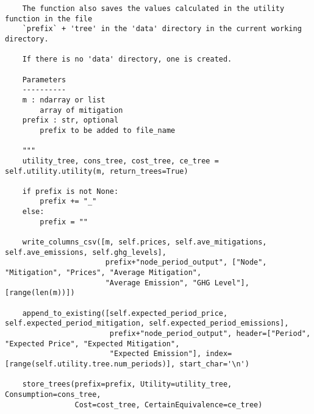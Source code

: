 \documentclass[12pt]{article}
\begin{document}
\begin{verbatim}
	The function also saves the values calculated in the utility function in the file
	`prefix` + 'tree' in the 'data' directory in the current working directory.

	If there is no 'data' directory, one is created.

	Parameters
	----------
	m : ndarray or list
		array of mitigation
	prefix : str, optional
		prefix to be added to file_name

	"""
	utility_tree, cons_tree, cost_tree, ce_tree = self.utility.utility(m, return_trees=True)
	
	if prefix is not None:
		prefix += "_"
	else:
		prefix = ""

	write_columns_csv([m, self.prices, self.ave_mitigations, self.ave_emissions, self.ghg_levels],
	                   prefix+"node_period_output", ["Node", "Mitigation", "Prices", "Average Mitigation",
	                   "Average Emission", "GHG Level"], [range(len(m))])

	append_to_existing([self.expected_period_price, self.expected_period_mitigation, self.expected_period_emissions],
						prefix+"node_period_output", header=["Period", "Expected Price", "Expected Mitigation",
						"Expected Emission"], index=[range(self.utility.tree.num_periods)], start_char='\n')

	store_trees(prefix=prefix, Utility=utility_tree, Consumption=cons_tree,
		        Cost=cost_tree, CertainEquivalence=ce_tree)
\end{verbatim}
\end{document}
